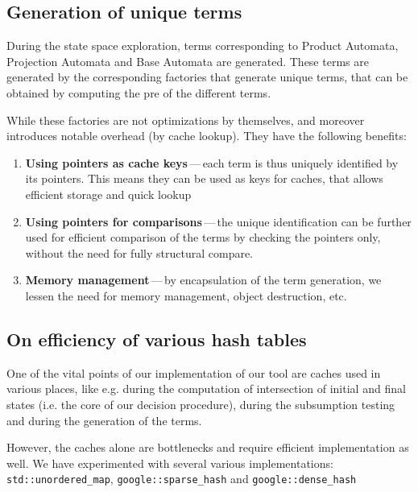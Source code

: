   \subsection{Generation of unique terms}\label{opt:unique}
  
  During the state space exploration, terms corresponding to Product
  Automata, Projection Automata and Base Automata are generated.
  These terms are generated by the corresponding factories that
  generate unique terms, that can be obtained by computing the
  pre of the different terms.
  
  While these factories are not optimizations by themselves, and 
  moreover introduces notable overhead (by cache lookup). They 
  have the following benefits:
  \begin{enumerate}
  	\item \textbf{Using pointers as cache keys}\,---\,each term is
  	thus uniquely identified by its pointers. This means they can
  	be used as keys for caches, that allows efficient storage and
  	quick lookup
  	\item \textbf{Using pointers for comparisons}\,---\,the unique
  	identification can be further used for efficient comparison of
  	the terms by checking the pointers only, without the need for
  	fully structural compare.
  	\item \textbf{Memory management}\,---\,by encapsulation of the
  	term generation, we lessen the need for memory management, 
  	object destruction, etc.
  \end{enumerate}
  
  \subsection{On efficiency of various hash tables}
  
  One of the vital points of our implementation of our tool
  are caches used in various places, like e.g. during the
  computation of intersection of initial and final states 
  (i.e. the core of our decision procedure), during the
  subsumption testing and during the generation of the terms.
  
  However, the caches alone are bottlenecks and require efficient
  implementation as well. We have experimented with several 
  various implementations: \texttt{std::unordered\_map},
  \texttt{google::sparse\_hash} and \texttt{google::dense\_hash}
  
